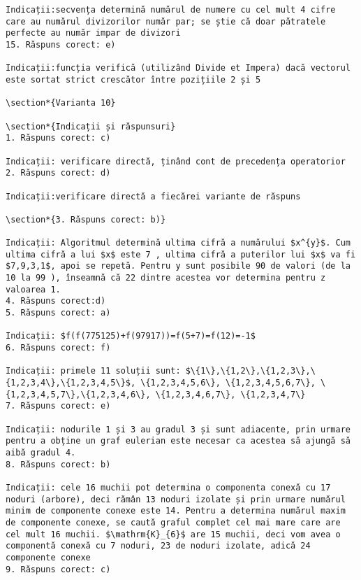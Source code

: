 \begin{verbatim}
Indicații:secvența determină numărul de numere cu cel mult 4 cifre care au numărul divizorilor număr par; se știe că doar pătratele perfecte au număr impar de divizori
15. Răspuns corect: e)

Indicații:funcția verifică (utilizând Divide et Impera) dacă vectorul este sortat strict crescător între pozițiile 2 și 5

\section*{Varianta 10}

\section*{Indicații și răspunsuri}
1. Răspuns corect: c)

Indicații: verificare directă, ținând cont de precedența operatorior
2. Răspuns corect: d)

Indicații:verificare directă a fiecărei variante de răspuns

\section*{3. Răspuns corect: b)}

Indicații: Algoritmul determină ultima cifră a numărului $x^{y}$. Cum ultima cifră a lui $x$ este 7 , ultima cifră a puterilor lui $x$ va fi $7,9,3,1$, apoi se repetă. Pentru y sunt posibile 90 de valori (de la 10 la 99 ), înseamnă că 22 dintre acestea vor determina pentru z valoarea 1.
4. Răspuns corect:d)
5. Răspuns corect: a)

Indicații: $f(f(775125)+f(97917))=f(5+7)=f(12)=-1$
6. Răspuns corect: f)

Indicații: primele 11 soluții sunt: $\{1\},\{1,2\},\{1,2,3\},\{1,2,3,4\},\{1,2,3,4,5\}$, \{1,2,3,4,5,6\}, \{1,2,3,4,5,6,7\}, \{1,2,3,4,5,7\},\{1,2,3,4,6\}, \{1,2,3,4,6,7\}, \{1,2,3,4,7\}
7. Răspuns corect: e)

Indicații: nodurile 1 și 3 au gradul 3 și sunt adiacente, prin urmare pentru a obține un graf eulerian este necesar ca acestea să ajungă să aibă gradul 4.
8. Răspuns corect: b)

Indicații: cele 16 muchii pot determina o componenta conexă cu 17 noduri (arbore), deci rămân 13 noduri izolate și prin urmare numărul minim de componente conexe este 14. Pentru a determina numărul maxim de componente conexe, se caută graful complet cel mai mare care are cel mult 16 muchii. $\mathrm{K}_{6}$ are 15 muchii, deci vom avea o componentă conexă cu 7 noduri, 23 de noduri izolate, adică 24 componente conexe
9. Răspuns corect: c)


\end{verbatim}
